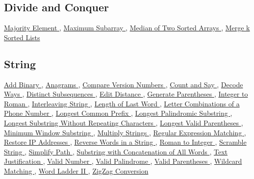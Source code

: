 \documentclass{article}
\begin{document}
\begin{CJK*}{UTF8}{gkai}
\subsection*{ Divide and Conquer }
\label{ Divide and Conquer }
\hyperref[ Majority Element ]{ Majority Element },
\hyperref[ Maximum Subarray ]{ Maximum Subarray },
\hyperref[ Median of Two Sorted Arrays ]{ Median of Two Sorted Arrays },
\hyperref[ Merge k Sorted Lists ]{ Merge k Sorted Lists }

\subsection*{ String }
\label{ String }
\hyperref[ Add Binary ]{ Add Binary },
\hyperref[ Anagrams ]{ Anagrams },
\hyperref[ Compare Version Numbers ]{ Compare Version Numbers },
\hyperref[ Count and Say ]{ Count and Say },
\hyperref[ Decode Ways ]{ Decode Ways },
\hyperref[ Distinct Subsequences ]{ Distinct Subsequences },
\hyperref[ Edit Distance ]{ Edit Distance },
\hyperref[ Generate Parentheses ]{ Generate Parentheses },
\hyperref[ Integer to Roman ]{ Integer to Roman },
\hyperref[ Interleaving String ]{ Interleaving String },
\hyperref[ Length of Last Word ]{ Length of Last Word },
\hyperref[ Letter Combinations of a Phone Number ]{ Letter Combinations of a Phone Number },
\hyperref[ Longest Common Prefix ]{ Longest Common Prefix },
\hyperref[ Longest Palindromic Substring ]{ Longest Palindromic Substring },
\hyperref[ Longest Substring Without Repeating Characters ]{ Longest Substring Without Repeating Characters },
\hyperref[ Longest Valid Parentheses ]{ Longest Valid Parentheses },
\hyperref[ Minimum Window Substring ]{ Minimum Window Substring },
\hyperref[ Multiply Strings ]{ Multiply Strings },
\hyperref[ Regular Expression Matching ]{ Regular Expression Matching },
\hyperref[ Restore IP Addresses ]{ Restore IP Addresses },
\hyperref[ Reverse Words in a String ]{ Reverse Words in a String },
\hyperref[ Roman to Integer ]{ Roman to Integer },
\hyperref[ Scramble String ]{ Scramble String },
\hyperref[ Simplify Path ]{ Simplify Path },
\hyperref[ Substring with Concatenation of All Words ]{ Substring with Concatenation of All Words },
\hyperref[ Text Justification ]{ Text Justification },
\hyperref[ Valid Number ]{ Valid Number },
\hyperref[ Valid Palindrome ]{ Valid Palindrome },
\hyperref[ Valid Parentheses ]{ Valid Parentheses },
\hyperref[ Wildcard Matching ]{ Wildcard Matching },
\hyperref[ Word Ladder II ]{ Word Ladder II },
\hyperref[ ZigZag Conversion ]{ ZigZag Conversion }


\end{CJK*}
\end{document}
